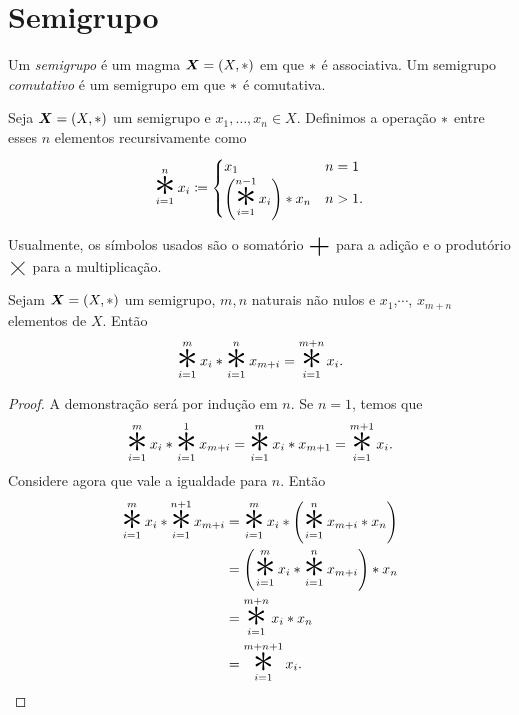 \section{Semigrupo}

\begin{defi}
	Um \emph{semigrupo} é um magma $\bm X=(X, \ast )$ em que $ \ast $ é associativa. Um semigrupo \emph{comutativo} é um semigrupo em que $ \ast $ é comutativa.
\end{defi}

\begin{defi}
	Seja $\bm X=(X, \ast )$ um semigrupo e $x_1, \ldots, x_n \in X$. Definimos a operação $ \ast $ entre esses $n$ elementos recursivamente como
	\begin{equation*}
	\bigopb _{i=1}^n x_i \coloneqq
		\begin{cases}
		x_1 & n=1\\
		\left(\displaystyle\bigopb _{i=1}^{n-1} x_i\right) \opb x_n & n>1.
		\end{cases}
	\end{equation*}
\end{defi}

	Usualmente, os símbolos usados são o somatório $\bigsum$ para a adição e o produtório $\bigtimes$ para a multiplicação.

\begin{prop}
	Sejam $\bm X=(X, \ast )$ um semigrupo, $m,n$ naturais não nulos e $x_1$,$ \cdots$, $x_{m+n}$ elementos de $X$. Então
	\begin{equation*}
	\bigopb _{i=1}^m x_i  \opb  \bigopb _{i=1}^n x_{m+i} = \bigopb _{i=1}^{m+n} x_i.
	\end{equation*}
\end{prop}
\begin{proof}
	A demonstração será por indução em $n$. Se $n=1$, temos que
	\begin{equation*}
	\bigopb _{i=1}^m x_i  \opb  \bigopb _{i=1}^1 x_{m+i} = \bigopb _{i=1}^m x_i  \opb  x_{m+1} = \bigopb _{i=1}^{m+1} x_i.
	\end{equation*}
Considere agora que vale a igualdade para $n$. Então
	\begin{equation*}
	\begin{split}
	\bigopb _{i=1}^m x_i  \opb  \bigopb _{i=1}^{n+1} x_{m+i} &=  \bigopb _{i=1}^m x_i  \opb  \left( \bigopb _{i=1}^n x_{m+i}  \opb  x_n \right) \\
			&= \left( \bigopb _{i=1}^m x_i  \opb  \bigopb _{i=1}^n x_{m+i} \right)  \opb  x_n \\
			&= \bigopb _{i=1}^{m+n} x_i  \opb  x_n \\
			&= \bigopb _{i=1}^{m+n+1} x_i.
	\end{split}
	\end{equation*}
\end{proof}

